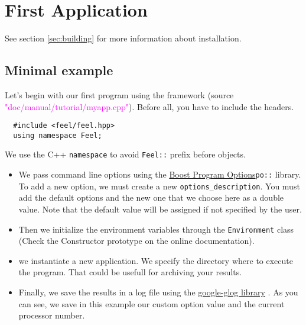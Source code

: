 %


\section{First \feel Application}
\label{sec:myapp}

See section \ref{sec:building} for more information about \feel installation.

\subsection{Minimal example}

Let's begin with our first program using the \feel framework
(source \textcolor{magenta}{"doc/manual/tutorial/myapp.cpp"}).
Before all, you have to include the \feel headers.
%
\vspace{2mm}
\begin{lstlisting}
  #include <feel/feel.hpp>
  using namespace Feel;
\end{lstlisting}
\vspace{2mm}
%
We use the C++ \lstinline!namespace! to avoid \lstinline!Feel::! prefix before
\feel objects.
%
\vspace{2mm}

\vspace{2mm}
%
\begin{itemize}
\item
We pass command line options using the
\href{http://www.boost.org/doc/libs/1_53_0/doc/html/program_options.html}
{Boost Program Options}\footnotemark[1] \lstinline!po::! library.
%
%
To add a new \feel option, we must create a new
\feel \lstinline!options_description!. You must add the default \feel options
and the new one that we choose here as a double value. Note that the default
value will be assigned if not specified by the user.

\item
Then we initialize the environment variables through the \feel
\lstinline!Environment! class (Check the Constructor prototype on the online documentation).

\item
we instantiate a new application. We specify the directory where to execute the
program. That could be usefull for archiving your results.

\item
Finally, we save the results in a log file using the
\href{http://code.google.com/p/google-glog/}{google-glog library}
\footnotemark[2].
%
%
As you can see, we save in this example our custom option value and the
current processor number.

\end{itemize}


